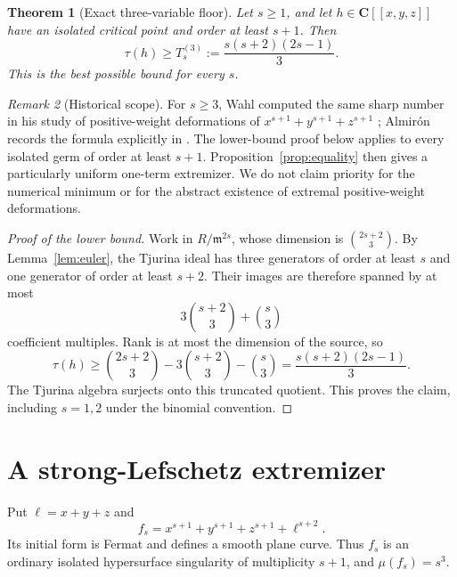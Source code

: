 \documentclass[11pt]{article}
\newtheorem{theorem}{Theorem}[section]
\theoremstyle{remark}
\newtheorem{remark}[theorem]{Remark}
\newcommand{\m}{\mathfrak m}
\begin{document}
\begin{theorem}[Exact three-variable floor]\label{thm:local3}
Let \(s\ge1\), and let \(h\in\mathbf C[[x,y,z]]\) have an isolated critical
point and order at least \(s+1\).  Then
\begin{equation}\label{eq:threefloor}
 \tau(h)\ge T^{(3)}_s:=\frac{s(s+2)(2s-1)}3.
\end{equation}
This is the best possible bound for every \(s\).
\end{theorem}

\begin{remark}[Historical scope]\label{rem:wahl}
For \(s\ge3\), Wahl computed the same sharp number in his study of
positive-weight deformations of
\(x^{s+1}+y^{s+1}+z^{s+1}\)
\cite[Example~4.7]{Wahl1985}; Almir\'on records the formula explicitly in
\cite[Example~4.6]{Almiron2022}.  The lower-bound proof below applies to
every isolated germ of order at least \(s+1\).  Proposition~\ref{prop:equality}
then gives a particularly uniform one-term extremizer.  We do not claim
priority for the numerical minimum or for the abstract existence of
extremal positive-weight deformations.
\end{remark}

\begin{proof}[Proof of the lower bound]
Work in \(R/\m^{2s}\), whose dimension is \(\binom{2s+2}{3}\).
By Lemma~\ref{lem:euler}, the Tjurina ideal has three generators of order at
least \(s\) and one generator of order at least \(s+2\).  Their images are
therefore spanned by at most
\[
 3\binom{s+2}{3}+\binom{s}{3}
\]
coefficient multiples.  Rank is at most the dimension of the source, so
\[
 \tau(h)\ge
 \binom{2s+2}{3}-3\binom{s+2}{3}-\binom{s}{3}
 =\frac{s(s+2)(2s-1)}3.
\]
The Tjurina algebra surjects onto this truncated quotient.  This proves the
claim, including \(s=1,2\) under the binomial convention.
\end{proof}

\section{A strong-Lefschetz extremizer}

Put \(\ell=x+y+z\) and
\begin{equation}\label{eq:extremizer}
 f_s=x^{s+1}+y^{s+1}+z^{s+1}+\ell^{s+2}.
\end{equation}
Its initial form is Fermat and defines a smooth plane curve.  Thus \(f_s\)
is an ordinary isolated hypersurface singularity of multiplicity \(s+1\),
and \(\mu(f_s)=s^3\).
\end{document}
